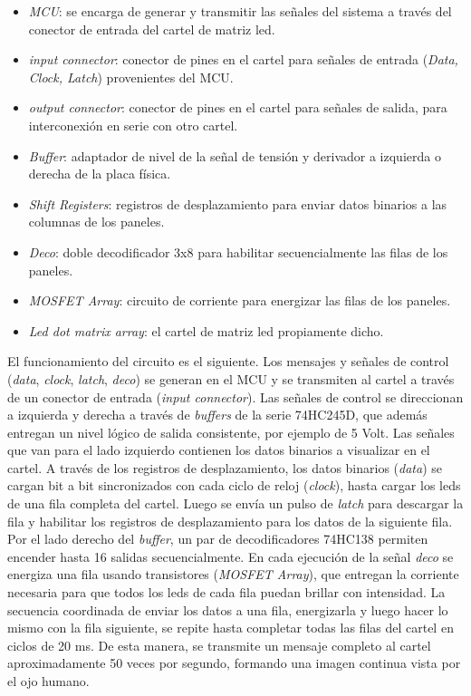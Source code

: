 \begin{itemize}
\item \textit{MCU}: se encarga de generar y transmitir las señales del sistema a través del conector de entrada del cartel de matriz led.
\item \textit{input connector}: conector de pines en el cartel para señales de entrada (\textit{Data, Clock, Latch}) provenientes del MCU.
\item \textit{output connector}: conector de pines en el cartel para señales de salida, para interconexión en serie con otro cartel.
\item \textit{Buffer}: adaptador de nivel de la señal de tensión y derivador a izquierda o derecha de la placa física.
\item \textit{Shift Registers}: registros de desplazamiento para enviar datos binarios a las columnas de los paneles.
\item \textit{Deco}: doble decodificador 3x8 para habilitar secuencialmente las filas de los paneles.
\item \textit{MOSFET Array}: circuito de corriente para energizar las filas de los paneles.
\item \textit{Led dot matrix array}: el cartel de matriz led propiamente dicho.
\end{itemize}

El funcionamiento del circuito es el siguiente. Los mensajes y señales de control (\textit{data}, \textit{clock}, \textit{latch}, \textit{deco}) se generan en el MCU y se transmiten al cartel a través de un conector de entrada (\textit{input connector}). Las señales de control se direccionan a izquierda y derecha a través de \textit{buffers} de la serie 74HC245D, que además entregan un nivel lógico de salida consistente, por ejemplo de 5 Volt. Las señales que van para el lado izquierdo contienen los datos binarios a visualizar en el cartel. A través de los registros de desplazamiento, los datos binarios (\textit{data}) se cargan bit a bit sincronizados con cada ciclo de reloj (\textit{clock}), hasta cargar los leds de una fila completa del cartel. Luego se envía un pulso de \textit{latch} para descargar la fila y habilitar los registros de desplazamiento para los datos de la siguiente fila. Por el lado derecho del \textit{buffer},  un par de decodificadores 74HC138 permiten encender hasta 16 salidas secuencialmente. En cada ejecución de la señal \textit{deco} se energiza una fila usando transistores (\textit{MOSFET Array}), que entregan la corriente necesaria para que todos los leds de cada fila puedan brillar con intensidad. La secuencia coordinada de enviar los datos a una fila, energizarla y luego hacer lo mismo con la fila siguiente, se repite hasta completar todas las filas del cartel en ciclos de 20 ms. De esta manera, se transmite un mensaje completo al cartel aproximadamente 50 veces por segundo, formando una imagen continua vista por el ojo humano.\\


